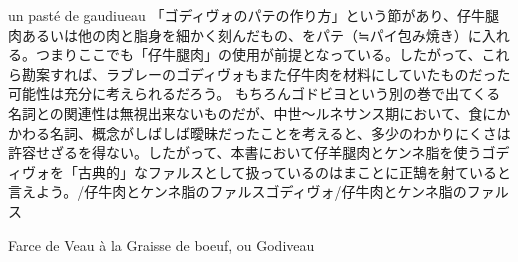 \begin{main}
{{{{  un pasté de gaudiueau
  「ゴディヴォのパテの作り方」という節があり、仔牛腿肉あるいは他の肉と脂身を細かく刻んだもの、をパテ（≒パイ包み焼き）に入れる。つまりここでも「仔牛腿肉」の使用が前提となっている。したがって、これら勘案すれば、ラブレーのゴディヴォもまた仔牛肉を材料にしていたものだった可能性は充分に考えられるだろう。
  もちろんゴドビヨという別の巻で出てくる名詞との関連性は無視出来ないものだが、中世〜ルネサンス期において、食にかかわる名詞、概念がしばしば曖昧だったことを考えると、多少のわかりにくさは許容せざるを得ない。したがって、本書において仔羊腿肉とケンネ脂を使うゴディヴォを「古典的」なファルスとして扱っているのはまことに正鵠を射ていると言えよう。}/仔牛肉とケンネ脂のファルス}{ゴディヴォ/仔牛肉とケンネ脂のファルス}}\label{godiveau}}

\begin{frsecbenv}

Farce de Veau à la Graisse de boeuf, ou Godiveau

\end{frsecbenv}

 

\end{main}

